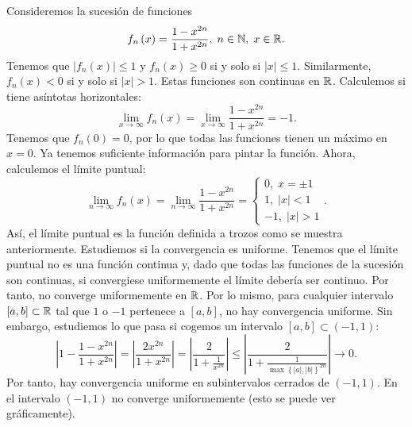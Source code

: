 \begin{eg}
\normalfont Consideremos la sucesión de funciones
\[f_{n}\left(x\right) = \frac{1-x^{2n}}{1+x^{2n}}, \; n \in \mathbb{N}, \; x \in \mathbb{R} .\]
Tenemos que $\displaystyle \left|f_{n}\left(x\right)\right| \leq 1 $ y $\displaystyle f_{n}\left(x\right) \geq 0 $ si y solo si $\displaystyle \left|x\right| \leq 1 $. Similarmente, $\displaystyle f_{n}\left(x\right) < 0$ si y solo si $\displaystyle \left|x\right| > 1 $. Estas funciones son continuas en $\displaystyle \mathbb{R} $. Calculemos si tiene asíntotas horizontales:
\[\lim_{x \to \infty}f_{n}\left(x\right) = \lim_{x \to \infty}\frac{1-x^{2n}}{1 + x^{2n}} = - 1 .\]
Tenemos que $\displaystyle f_{n}\left(0\right) = 0 $, por lo que todas las funciones tienen un máximo en $\displaystyle x = 0 $. Ya tenemos suficiente información para pintar la función. Ahora, calculemos el límite puntual:
\[\lim_{n \to \infty}f_{n}\left(x\right) = \lim_{n \to \infty}\frac{1-x^{2n}}{1+x^{2n}} = 
\begin{cases}
0, \; x = \pm 1 \\
1, \; \left|x\right| < 1 \\
-1, \; \left|x\right| > 1
\end{cases}
.\]
Así, el límite puntual es la función definida a trozos como se muestra anteriormente. Estudiemos si la convergencia es uniforme. Tenemos que el límite puntual no es una función continua y, dado que todas las funciones de la sucesión son continuas, si convergiese uniformemente el límite debería ser continuo. Por tanto, no converge uniformemente en $\displaystyle \mathbb{R} $. Por lo mismo, para cualquier intervalo $\displaystyle \left[a,b\right] \subset \mathbb{R} $ tal que $\displaystyle 1 $ o $\displaystyle -1 $ pertenece a $\displaystyle \left[a,b\right]  $, no hay convergencia uniforme. Sin embargo, estudiemos lo que pasa si cogemos un intervalo $\displaystyle \left[a,b\right] \subset \left(-1,1\right) $:
\[ \left|1 - \frac{1-x^{2n}}{1 +x^{2n}}\right| = \left|\frac{2x^{2n}}{1 + x^{2n}}\right| = \left|\frac{2}{1+\frac{1}{x^{2n}}}\right| \leq \left|\frac{2}{1 + \frac{1}{\max \left\{ \left|a\right|, \left|b\right|\right\} ^{2n}}}\right| \to 0 .\]
Por tanto, hay convergencia uniforme en subintervalos cerrados de $\displaystyle \left(-1,1\right) $. En el intervalo $\displaystyle \left(-1,1\right) $ no converge uniformemente (esto se puede ver gráficamente).
\end{eg}
